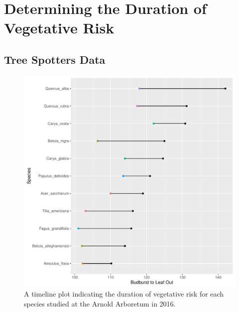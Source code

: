 \documentclass{article}\usepackage[]{graphicx}\usepackage[]{color}
\makeatletter
\def\maxwidth{ %
  \ifdim\Gin@nat@width>\linewidth
    \linewidth
  \else
    \Gin@nat@width
  \fi
}
\makeatother
\begin{document}
\section{Determining the Duration of Vegetative Risk}
\subsection{Tree Spotters Data}

\begin{figure}[H]
\includegraphics[width=\maxwidth]{figure/treespotters-1} \caption[A timeline plot indicating the duration of vegetative risk for each species studied at the Arnold Arboretum in 2016]{A timeline plot indicating the duration of vegetative risk for each species studied at the Arnold Arboretum in 2016.}\label{fig:treespotters}
\end{figure}
\end{document}
